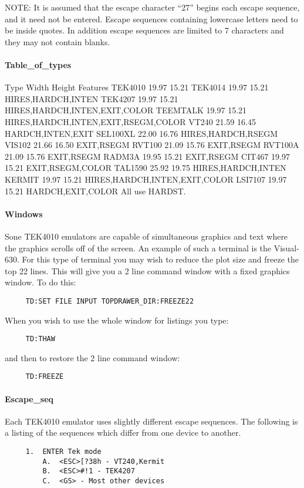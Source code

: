 NOTE:   It  is  assumed  that the escape character ``27'' begins each
escape sequence, and it need  not  be  entered.   Escape  sequences
containing lowercase letters need to be inside quotes.  In addition
escape sequences are limited to  7  characters  and  they  may  not
contain blanks.  
\paragraph{Table\_of\_types}
Type      Width  Height Features
TEK4010   19.97  15.21
TEK4014   19.97  15.21  HIRES,HARDCH,INTEN
TEK4207   19.97  15.21  HIRES,HARDCH,INTEN,EXIT,COLOR
TEEMTALK  19.97  15.21  HIRES,HARDCH,INTEN,EXIT,RSEGM,COLOR
VT240     21.59  16.45  HARDCH,INTEN,EXIT
SEL100XL  22.00  16.76  HIRES,HARDCH,RSEGM
VIS102    21.66  16.50  EXIT,RSEGM
RVT100    21.09  15.76  EXIT,RSEGM
RVT100A   21.09  15.76  EXIT,RSEGM
RADM3A    19.95  15.21  EXIT,RSEGM
CIT467    19.97  15.21  EXIT,RSEGM,COLOR
TAL1590          25.92  19.75 HIRES,HARDCH,INTEN
KERMIT    19.97  15.21  HIRES,HARDCH,INTEN,EXIT,COLOR
LSI7107          19.97  15.21 HARDCH,EXIT,COLOR
All use HARDST.
\paragraph{Windows}
Sone  TEK4010  emulators  are  capable of simultaneous graphics and
text where the graphics scrolls off of the screen.  An  example  of
such  a  terminal is the Visual-630.  For this type of terminal you
may wish to reduce the plot size and freeze the top 22 lines.  This
will give you a 2 line command window with a fixed graphics window.
To do this:  
\begin{verbatim}
     TD:SET FILE INPUT TOPDRAWER_DIR:FREEZE22 
\end{verbatim}
When you wish to use the whole window for listings you type:  
\begin{verbatim}
     TD:THAW 
\end{verbatim}
and then to restore the 2 line command window:  
\begin{verbatim}
     TD:FREEZE 
\end{verbatim}
\paragraph{Escape\_seq}
Each  TEK4010  emulator  uses  slightly different escape sequences.
The following is a listing of the sequences which differ  from  one
device to another.  

\begin{verbatim}
     1.  ENTER Tek mode 
         A.  <ESC>[?38h - VT240,Kermit 
         B.  <ESC>#!1 - TEK4207 
         C.  <GS> - Most other devices 
\end{verbatim}

